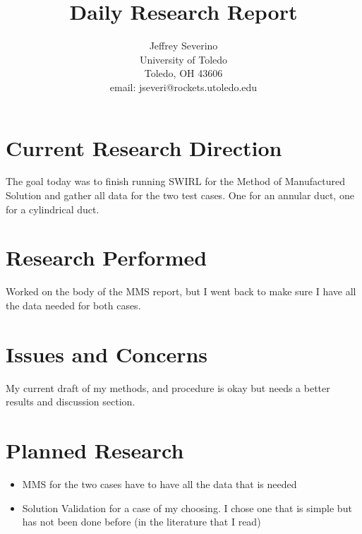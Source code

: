 \documentclass[a4paper]{article}
\begin{document}
\begin{titlepage}

    \title{
    Daily Research Report}

    \author{ Jeffrey Severino \\
        University of Toledo \\
        Toledo, OH  43606 \\
    email: jseveri@rockets.utoledo.edu}


    \maketitle

\end{titlepage}
\section{Current Research Direction}
The goal today was to finish running SWIRL for the Method of Manufactured Solution 
and gather all data for the two test cases. One for an annular duct, one 
for a cylindrical duct.

\section{Research Performed}
Worked on the body of the MMS report, but I went back to make sure I have all the 
data needed for both cases.


\section{Issues and Concerns}
My current draft of my methods, and procedure is okay but needs a better results 
and discussion section.
\section{Planned Research}
\begin{itemize}
    \item MMS for the two cases have to have all the data that is needed
    \item Solution Validation for a case of my choosing. I chose one that is simple
        but has not been done before (in the literature that I read)
\end{itemize}
\end{document}
